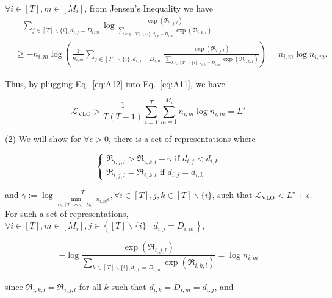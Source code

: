 $\forall i \in[T], m \in\left[M_i\right]$, from Jensen's Inequality we have
\begin{equation}
\begin{aligned}
& -\sum\limits_{j \in[T] \backslash\{i\}, d_{i, j}=D_{i, m}} \log \frac{\exp \left(\mathfrak{R}_{i, j,l}\right)}{\sum\limits_{k \in[T] \backslash\{i\}, d_{i, k}=D_{i, m}} \exp \left(\mathfrak{R}_{i, k,l}\right)} \\
& \geq-n_{i, m} \log \left(\frac{1}{n_{i, m}} \sum\limits_{j \in[T] \backslash\{i\}, d_{i, j}=D_{i, m}} \frac{\exp \left(\mathfrak{R}_{i, j,l}\right)}{\sum\limits_{k \in[T] \backslash\{i\}, d_{i, k}=D_{i, m}} \exp \left(\mathfrak{R}_{i, k,l}\right)}\right)=n_{i, m} \log n_{i, m} .
\end{aligned}
\label{eq:A12}
\end{equation}

Thus, by plugging Eq.~\eqref{eq:A12} into Eq.~\eqref{eq:A11}, we have

\begin{equation} \label{eq:A13}
    \mathcal{L}_{\mathrm{VLO}}>\frac{1}{T(T-1)} \sum\limits_{i=1}^{T} \sum\limits_{m=1}^{M_i} n_{i, m} \log n_{i, m}=L^{\star}
\end{equation}



(2) We will show for $\forall \epsilon>0$, there is a set of representations where

$$
\left\{\begin{array}{l}
\mathfrak{R}_{i, j,l}>\mathfrak{R}_{i, k,l}+\gamma \text { if } d_{i, j}<d_{i, k} \\
\mathfrak{R}_{i, j,l}=\mathfrak{R}_{i, k,l} \text { if } d_{i, j}=d_{i, k}
\end{array}\right.
$$

and $\gamma:=\log \frac{T}{\min\limits_{i \in[T], m \in\left[M_i\right]}n_{i, m} \epsilon}, \forall i \in[T], j, k \in[T] \backslash\{i\}$, such that $\mathcal{L}_{\mathrm{VLO}}<L^{\star}+\epsilon$.
For such a set of representations, $\forall i \in[T], m \in\left[M_i\right], j \in\left\{[T] \backslash\{i\} \mid d_{i, j}=D_{i, m}\right\}$,

\begin{equation} \label{eq:A14}
    -\log \frac{\exp \left(\mathfrak{R}_{i, j,l}\right)}{\sum\limits_{k \in[T] \backslash\{i\}, d_{i, k}=D_{i, m}} \exp \left(\mathfrak{R}_{i, k,l}\right)}=\log n_{i, m}
\end{equation}

since $\mathfrak{R}_{i, k,l}=\mathfrak{R}_{i, j,l}$ for all $k$ such that $d_{i, k}=D_{i, m}=d_{i, j}$, and

